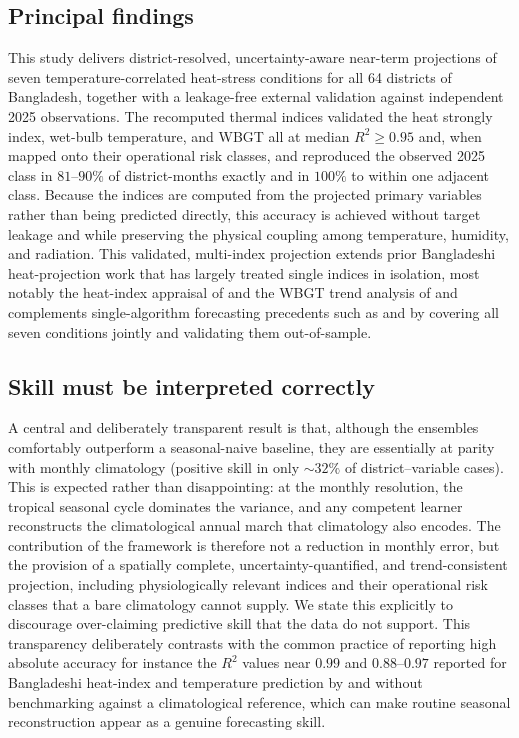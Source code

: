 \documentclass[pdflatex,sn-basic,lineno]{sn-jnl}
\begin{document}
\subsection{Principal findings}
This study delivers district-resolved, uncertainty-aware near-term projections of
seven temperature-correlated heat-stress conditions for all 64 districts of
Bangladesh, together with a leakage-free external validation against independent
2025 observations. The recomputed thermal indices validated the heat strongly
index, wet-bulb temperature, and WBGT all at median $R^{2}\ge0.95$ and, when
mapped onto their operational risk classes, and reproduced the observed 2025 class in
$81$--$90\%$ of district-months exactly and in $100\%$ to within one adjacent
class. Because the indices are computed from the projected primary variables
rather than being predicted directly, this accuracy is achieved without target leakage
and while preserving the physical coupling among temperature, humidity, and
radiation. This validated, multi-index projection extends prior Bangladeshi
heat-projection work that has largely treated single indices in isolation, most
notably the heat-index appraisal of \citet{rahman2021} and the WBGT trend analysis
of \citet{kamal2024scientific} and complements single-algorithm forecasting
precedents such as \citet{mollah2026mlheatindex} and \citet{islam2026enso} by
covering all seven conditions jointly and validating them out-of-sample.

\subsection{Skill must be interpreted correctly}
A central and deliberately transparent result is that, although the ensembles
comfortably outperform a seasonal-naive baseline, they are essentially at parity
with monthly climatology (positive skill in only $\sim\!32\%$ of
district--variable cases). This is expected rather than disappointing: at the monthly
resolution, the tropical seasonal cycle dominates the variance, and any competent
learner reconstructs the climatological annual march that climatology also
encodes. The contribution of the framework is therefore not a reduction in
monthly error, but the provision of a spatially complete, uncertainty-quantified,
and trend-consistent projection, including physiologically relevant indices and
their operational risk classes that a bare climatology cannot supply. We state
this explicitly to discourage over-claiming predictive skill that the data do not
support. This transparency deliberately contrasts with the common practice of
reporting high absolute accuracy for instance the $R^{2}$ values near $0.99$ and
$0.88$--$0.97$ reported for Bangladeshi heat-index and temperature prediction by
\citet{mollah2026mlheatindex} and \citet{islam2026enso} without benchmarking
against a climatological reference, which can make routine seasonal reconstruction
appear as a genuine forecasting skill.
\end{document}
